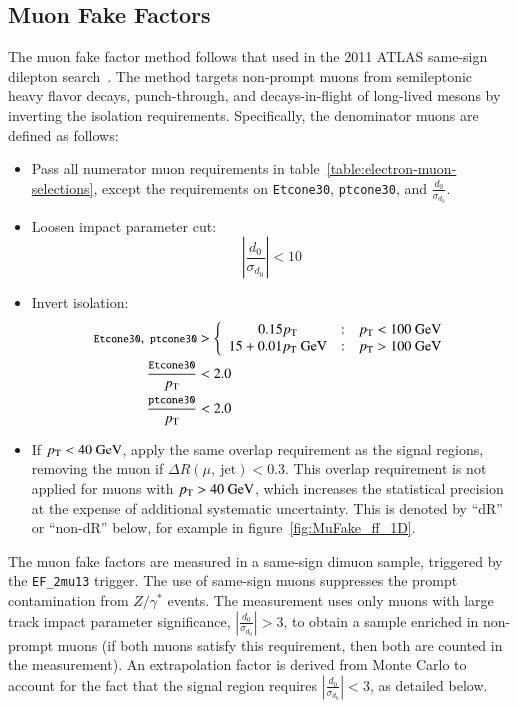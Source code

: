 \subsection{Muon Fake Factors}\label{sec:muon-fake-factors}
The muon fake factor method follows that used in the 2011 ATLAS same-sign dilepton search~\cite{TheATLASCollaboration:2012df}. The method targets non-prompt muons from semileptonic heavy flavor decays, punch-through, and decays-in-flight of long-lived mesons by inverting the isolation requirements. Specifically, the denominator muons are defined as follows:
\begin{itemize}
  \item Pass all numerator muon requirements in table~\ref{table:electron-muon-selections}, except the requirements on \verb.Etcone30., \verb.ptcone30., and $\frac{d_0}{\sigma_{d_0}}$. 
  \item Loosen impact parameter cut:
  \begin{equation}
	|\frac{d_0}{\sigma_{d_0}}|<10
  \end{equation}
  \item Invert isolation:
  \begin{align}
	{\footnotesize \texttt{Etcone30}},\ {\footnotesize \texttt{ptcone30}} &> \left\{\begin{array}{ccc} 0.15 p_{\text{T}} & : & p_{\text{T}}<100~\mbox{GeV} \\ 15+0.01 p_{\text{T}}~\mbox{GeV} & : & p_{\text{T}}>100~\mbox{GeV} \end{array} \right. \\
	{\footnotesize \frac{\texttt{Etcone30}}{p_{\text{T}}}} &< 2.0 \\
	{\footnotesize \frac{\texttt{ptcone30}}{p_{\text{T}}}} &< 2.0 \\
  \end{align}
  \item If $p_{\text{T}}<40~\mbox{GeV}$, apply the same overlap requirement as the signal regions, removing the muon if $\Delta R (\mu,\ \mbox{jet})<0.3$. This overlap requirement is not applied for muons with $p_{\text{T}}>40~\mbox{GeV}$, which increases the statistical precision at the expense of additional systematic uncertainty. This is denoted by ``dR'' or ``non-dR'' below, for example in figure~\ref{fig:MuFake_ff_1D}.
\end{itemize}

The muon fake factors are measured in a same-sign dimuon sample, triggered by the \verb.EF_2mu13. trigger. The use of same-sign muons suppresses the prompt contamination from $Z/\gamma^{*}$ events. The measurement uses only muons with large track impact parameter significance, $|\frac{d_0}{\sigma_{d_0}}|>3$, to obtain a sample enriched in non-prompt muons (if both muons satisfy this requirement, then both are counted in the measurement). An extrapolation factor is derived from Monte Carlo to account for the fact that the signal region requires $|\frac{d_0}{\sigma_{d_0}}|<3$, as detailed below.

